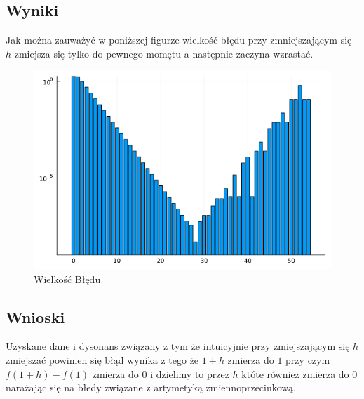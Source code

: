 \documentclass{article}
\begin{document}
\subsection{Wyniki}
Jak można zauważyć w poniższej figurze wielkość błędu przy zmniejszającym się $h$ zmiejsza się tylko do pewnego momętu a następnie zaczyna wzrastać.
    \begin{figure}[H]
        \centering
        \includegraphics[width=0.75\linewidth]{7.png}
        \caption{Wielkość Błędu}
        \label{fig:enter-label}
    \end{figure}
\subsection{Wnioski}
    Uzyskane dane i dysonans związany z tym że intuicyjnie przy zmiejszającym się $h$ zmiejszać powinien się błąd wynika z tego że $1+h$ zmierza do $1$ przy czym $f(1+h) - f(1)$ zmierza do $0$ i dzielimy to przez $h$ któte również zmierza do $0$ narażając się na błedy związane z artymetyką zmiennoprzecinkową.
\end{document}
